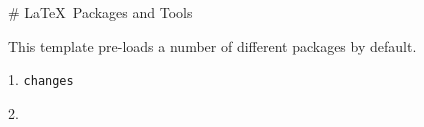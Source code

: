 


\newpage
\begin{markdown}

# \LaTeX\ Packages and Tools

This template pre-loads a number of different packages by default. 

1. \texttt{changes}

2. 

\end{markdown}